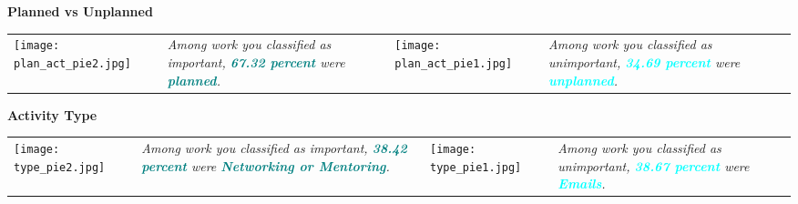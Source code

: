 \documentclass[a4paper]{article}
\begin{document}
\begin{center}
    \Large{\textbf{Planned vs Unplanned}}
    \end{center}
    \begin{table}[h!]
     \begin{center}
     \begin{tabular}{m{4cm} m{3.5cm} m{4cm} m{3.5cm}}
     \begin {minipage} {7cm}
         \texttt{[image: plan\_act\_pie2.jpg]}
     \end{minipage}
     &
     \begin {minipage} {3.5cm}
    \large{\textit{Among work you classified as important, \textbf{\textcolor{teal}{67.32 percent}} were \textbf{\textcolor{teal}{planned}}.}}
     \end{minipage}
      &
      \begin{minipage}{4cm}
          \texttt{[image: plan\_act\_pie1.jpg]}
      \end{minipage}
      &
      \begin{minipage}{3.5cm}
      \large{\textit{Among work you classified as unimportant, \textbf{\textcolor{cyan}{34.69 percent}} were \textbf{\textcolor{cyan}{unplanned}}.}}
      \end{minipage}
      \end{tabular}
      \end{center}
      \end{table}

\begin{center}
    \Large{\textbf{Activity Type}}
    \end{center}
    \begin{table}[h!]
     \begin{center}
     \begin{tabular}{m{4cm} m{3.5cm} m{4cm} m{3.5cm}}
     \begin {minipage} {4cm}
         \texttt{[image: type\_pie2.jpg]}
     \end{minipage}
     &
     \begin {minipage} {3.5cm}
    \large{\textit{Among work you classified as important, \textbf{\textcolor{teal}{38.42 percent}} were \textbf{\textcolor{teal}{Networking or Mentoring}}.}}
     \end{minipage}
      & 
      \begin{minipage}{4cm}
    \texttt{[image: type\_pie1.jpg]}
      \end{minipage}
      &
      \begin{minipage}{3.5cm}
      \large{\textit{Among work you classified as unimportant, \textbf{\textcolor{cyan}{38.67 percent}} were \textbf{\textcolor{cyan}{Emails}}.}}
      \end{minipage}
      \end{tabular}
      \end{center}
      \end{table}
\end{document}
